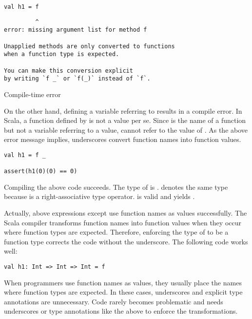 \begin{verbatim}
val h1 = f
\end{verbatim}
\vspace{-1em}
\begin{mdframed}[hidealllines=true,backgroundcolor=red!10,innerleftmargin=3pt,innerrightmargin=3pt,leftmargin=-3pt,rightmargin=-3pt]
\begin{verbatim}
         ^
error: missing argument list for method f

Unapplied methods are only converted to functions
when a function type is expected.

You can make this conversion explicit
by writing `f _` or `f(_)` instead of `f`.
\end{verbatim}
\vspace{-2em}
\begin{flushright}
\scriptsize\textsf{Compile-time error}
\end{flushright}
\end{mdframed}

On the other hand, defining a variable referring to  results in a compile
error. In Scala, a function defined by  is not a value per se. Since 
is the name of a function but not a variable referring to a value, 
cannot refer to the value of . As the above error message implies,
underscores convert function names into function values.

\begin{verbatim}
val h1 = f _

assert(h1(0)(0) == 0)
\end{verbatim}

Compiling the above code succeeds. The type of  is .
 denotes the same type because \code{=>} is
a right-associative type operator.  is valid and yields .

Actually, above expressions except  use function names as values
successfully. The Scala compiler transforms function names into function values
when they occur where function types are expected. Therefore, enforcing the type of
 to be a function type corrects the code without the underscore. The
following code works well:

\begin{verbatim}
val h1: Int => Int => Int = f
\end{verbatim}

When programmers use function names as values, they usually place the names where
function types are expected. In these cases, underscores and explicit type
annotations are unnecessary. Code rarely becomes problematic and needs
underscores or type annotations like the above to enforce the transformations.

